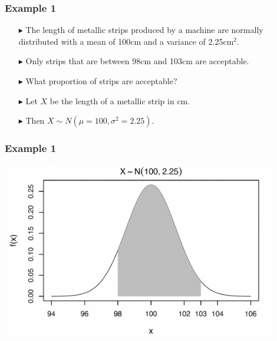 \documentclass[12pt]{beamer}
\begin{document}
\begin{frame}
	\frametitle{Example 1}
	
	\begin{itemize}
		\item[\color{blue}$\blacktriangleright$] The length of metallic strips produced by a machine 
		are normally distributed with a mean of 100cm and 
		a variance of 2.25cm$^2$.
		
		\item[\color{blue}$\blacktriangleright$] Only strips that are between 98cm and 103cm are 
		acceptable.
		
		\item[\color{blue}$\blacktriangleright$] What proportion of strips are acceptable?
		
		\item[\color{blue}$\blacktriangleright$] Let $X$ be the length of a metallic strip in cm.
		
		\item[\color{blue}$\blacktriangleright$] Then $X \sim N(\mu = 100, \sigma^2 = 2.25)$.
	\end{itemize}
	
	\end{frame}
	
	\begin{frame}
		\frametitle{Example 1}
\centering
\includegraphics[width=12cm]{example1.png}
	\end{frame}
\end{document}
